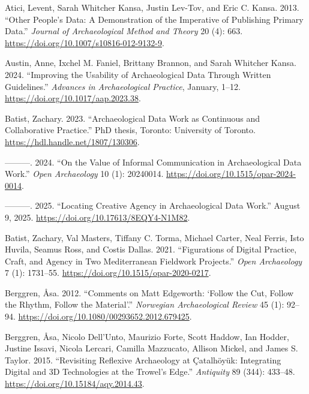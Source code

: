 \documentclass[
]{article}
\newlength{\cslhangindent}
\newenvironment{CSLReferences}[2] %
 {\begin{list}{}{%
  \setlength{\itemindent}{0pt}
  \setlength{\leftmargin}{0pt}
  \setlength{\parsep}{0pt}
  \ifodd #1
   \setlength{\leftmargin}{\cslhangindent}
   \setlength{\itemindent}{-1\cslhangindent}
  \fi
  \setlength{\itemsep}{#2\baselineskip}}}
 {\end{list}}
\begin{document}
\label{refs}
\begin{CSLReferences}{1}{0}
Atici, Levent, Sarah Whitcher Kansa, Justin Lev-Tov, and Eric C. Kansa.
2013. {``Other {People}'s {Data}: {A Demonstration} of the {Imperative}
of {Publishing Primary Data}.''} \emph{Journal of Archaeological Method
and Theory} 20 (4): 663.
\url{https://doi.org/10.1007/s10816-012-9132-9}.

Austin, Anne, Ixchel M. Faniel, Brittany Brannon, and Sarah Whitcher
Kansa. 2024. {``Improving the {Usability} of {Archaeological Data}
Through {Written Guidelines}.''} \emph{Advances in Archaeological
Practice}, January, 1--12. \url{https://doi.org/10.1017/aap.2023.38}.

Batist, Zachary. 2023. {``Archaeological Data Work as Continuous and
Collaborative Practice.''} PhD thesis, Toronto: University of Toronto.
\url{https://hdl.handle.net/1807/130306}.

---------. 2024. {``On the {Value} of {Informal Communication} in
{Archaeological Data Work}.''} \emph{Open Archaeology} 10 (1): 20240014.
\url{https://doi.org/10.1515/opar-2024-0014}.

---------. 2025. {``Locating {Creative Agency} in {Archaeological Data
Work}.''} August 9, 2025. \url{https://doi.org/10.17613/8EQY4-N1M82}.

Batist, Zachary, Val Masters, Tiffany C. Torma, Michael Carter, Neal
Ferris, Isto Huvila, Seamus Ross, and Costis Dallas. 2021.
{``Figurations of {Digital Practice}, {Craft}, and {Agency} in {Two
Mediterranean Fieldwork Projects}.''} \emph{Open Archaeology} 7 (1):
1731--55. \url{https://doi.org/10.1515/opar-2020-0217}.

Berggren, Åsa. 2012. {``Comments on {Matt Edgeworth}: {`{Follow} the
{Cut}, {Follow} the {Rhythm}, {Follow} the {Material}'}.''}
\emph{Norwegian Archaeological Review} 45 (1): 92--94.
\url{https://doi.org/10.1080/00293652.2012.679425}.

Berggren, Åsa, Nicolo Dell'Unto, Maurizio Forte, Scott Haddow, Ian
Hodder, Justine Issavi, Nicola Lercari, Camilla Mazzucato, Allison
Mickel, and James S. Taylor. 2015. {``Revisiting Reflexive Archaeology
at {Çatalhöyük}: {Integrating} Digital and {3D} Technologies at the
Trowel's Edge.''} \emph{Antiquity} 89 (344): 433--48.
\url{https://doi.org/10.15184/aqy.2014.43}.


\end{CSLReferences}
\end{document}
